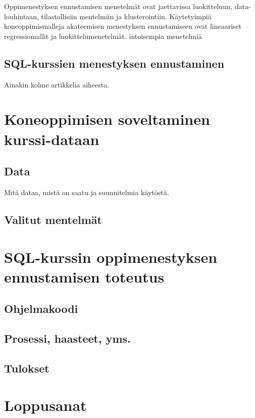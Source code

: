 \documentclass[finnish,twoside,openright]{HYgraduMLDS}
\begin{document}
Oppimenestyksen ennustamisen menetelmät ovat jaettavissa luokitteluun, data-louhintaan, tilastollisiin mentelmiin ja klusterointiin\cite{hellas2018predicting}. Käytetyimpiä koneoppimismalleja akateemisen menestyksen ennustamiseen ovat lineaariset regressiomallit ja luokittelumenetelmät. intoisempia menetelmiä 


\section{SQL-kurssien menestyksen ennustaminen}

Ainakin kolme artikkelia aiheesta.


\chapter{Koneoppimisen soveltaminen kurssi-dataan}

\section{Data}

Mitä dataa, mistä on saatu ja suunnitelmia käytöstä.


\section{Valitut mentelmät}


\chapter{SQL-kurssin oppimenestyksen ennustamisen toteutus}

\section{Ohjelmakoodi}


\section{Prosessi, haasteet, yms.}


\section{Tulokset}


\chapter{Loppusanat\label{chapter:Loppusanat}}
\end{document}
